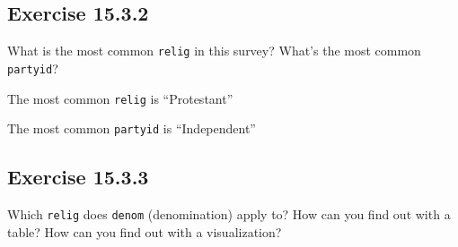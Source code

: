 \documentclass[]{book}
\newenvironment{Shaded}{\begin{snugshade}}{\end{snugshade}}
\newcommand{\CommentTok}[1]{\textcolor[rgb]{0.56,0.35,0.01}{\textit{#1}}}
\newcommand{\DecValTok}[1]{\textcolor[rgb]{0.00,0.00,0.81}{#1}}
\newcommand{\KeywordTok}[1]{\textcolor[rgb]{0.13,0.29,0.53}{\textbf{#1}}}
\newcommand{\NormalTok}[1]{#1}
\newcommand{\OperatorTok}[1]{\textcolor[rgb]{0.81,0.36,0.00}{\textbf{#1}}}
\newcommand{\StringTok}[1]{\textcolor[rgb]{0.31,0.60,0.02}{#1}}
\theoremstyle{plain}
\theoremstyle{remark}
\theoremstyle{definition}
\theoremstyle{definition}
\theoremstyle{definition}
\theoremstyle{remark}
\begin{document}
\hypertarget{exercise-15.3.2}{%
\subsection*{\texorpdfstring{Exercise
{15.3.2}}{Exercise 15.3.2}}\label{exercise-15.3.2}}

What is the most common \texttt{relig} in this survey? What's the most
common \texttt{partyid}?

The most common \texttt{relig} is ``Protestant''

\begin{Shaded}
\end{Shaded}

The most common \texttt{partyid} is ``Independent''

\begin{Shaded}
\end{Shaded}

\hypertarget{exercise-15.3.3}{%
\subsection*{\texorpdfstring{Exercise
{15.3.3}}{Exercise 15.3.3}}\label{exercise-15.3.3}}

Which \texttt{relig} does \texttt{denom} (denomination) apply to? How
can you find out with a table? How can you find out with a
visualization?
\end{document}
